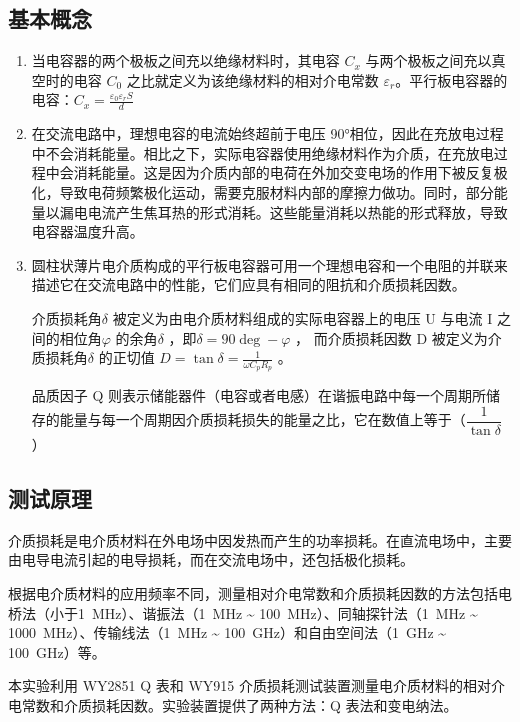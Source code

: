 \documentclass[a4paper,utf8]{article}
\begin{document}
    \subsection{基本概念}
        \begin{enumerate}
            \item 当电容器的两个极板之间充以绝缘材料时，其电容 $C_x$ 与两个极板之间充以真空时的电容 $C_0$ 之比就定义为该绝缘材料的相对介电常数 $\varepsilon_r$。平行板电容器的电容：$C_x=\frac{\varepsilon_0 \varepsilon_r S}{d}$
            \item 在交流电路中，理想电容的电流始终超前于电压 90°相位，因此在充放电过程中不会消耗能量。相比之下，实际电容器使用绝缘材料作为介质，在充放电过程中会消耗能量。这是因为介质内部的电荷在外加交变电场的作用下被反复极化，导致电荷频繁极化运动，需要克服材料内部的摩擦力做功。同时，部分能量以漏电电流产生焦耳热的形式消耗。这些能量消耗以热能的形式释放，导致电容器温度升高。
            \item 圆柱状薄片电介质构成的平行板电容器可用一个理想电容和一个电阻的并联来描述它在交流电路中的性能，它们应具有相同的阻抗和介质损耗因数。
            
            介质损耗角$\delta$ 被定义为由电介质材料组成的实际电容器上的电压 U 与电流 I 之间的相位角$\varphi$ 的余角$\delta$ ，即$\delta  = 90\deg - \varphi$ ，
            而介质损耗因数 D 被定义为介质损耗角$\delta$ 的正切值 $D=\tan\delta=\frac{1}{\omega C_{p}R_{p}}$ 。
            
            品质因子 Q 则表示储能器件（电容或者电感）在谐振电路中每一个周期所储存的能量与每一个周期因介质损耗损失的能量之比，它在数值上等于（$\dfrac{1}{\tan\delta}$）
        \end{enumerate}
        
    \subsection{测试原理}
    介质损耗是电介质材料在外电场中因发热而产生的功率损耗。在直流电场中，主要由电导电流引起的电导损耗，而在交流电场中，还包括极化损耗。

    根据电介质材料的应用频率不同，测量相对介电常数和介质损耗因数的方法包括电桥法（小于\SI{1}{\mega\hertz}）、谐振法（\SI{1}{\mega\hertz} \~{} \SI{100}{\mega\hertz}）、同轴探针法（\SI{1}{\mega\hertz} \~{} \SI{1000}{\mega\hertz}）、传输线法（\SI{1}{\mega\hertz} \~{} \SI{100}{\giga\hertz}）和自由空间法（\SI{1}{\giga\hertz} \~{} \SI{100}{\giga\hertz}）等。
    
    本实验利用 WY2851 Q 表和 WY915 介质损耗测试装置测量电介质材料的相对介电常数和介质损耗因数。实验装置提供了两种方法：Q 表法和变电纳法。
    
\end{document}

